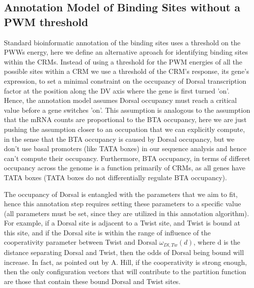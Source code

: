 \subsection{Annotation Model of Binding Sites without a PWM threshold}

Standard bioinformatic annotation of the binding sites uses a threshold on the PWWs energy, here we define an alternative aproach for identifying binding sites within the CRMs.  Instead of using a threshold for the PWM energies of all the possible sites within a CRM we use a threshold of the CRM's response, its gene's expression, to set a minimal constraint on the occupancy of Dorsal transcription factor at the position along the DV axis where the gene is first turned 'on'.  Hence, the annotation model assumes Dorsal occupancy must reach a critical value before a gene switches 'on'.  This assumption is analogous to the assumption that the mRNA counts are proportional to the BTA occupancy, here we are just pushing the assumption closer to an occupation that we can explicitly compute, in the sense that the BTA occupancy is caused by Dorsal occupancy, but we don't use basal promoters (like TATA boxes) in our sequence analysis and hence can't compute their occupancy.  Furthermore, BTA occupancy, in terms of differet occupancy across the genome is a function primarily of CRMs, as all genes have TATA boxes (TATA boxes do not differentially regulate BTA occupancy).  

The occupancy of Dorsal is entangled with the parameters that we aim to fit, hence this annotation step requires setting these parameters to a specific value (all parameters must be set, since they are utilized in this annotation algorithm).  For example, if a Dorsal site is adjacent to a Twist site, and Twist is bound at this site, and if the Dorsal site is within the range of influence of the cooperativity parameter between Twist and Dorsal $\omega_{Dl,Tw}(d)$, where d is the distance separating Dorsal and Twist, then the odds of Dorsal being bound will increase.  In fact, as pointed out by A. Hill, if the cooperativity is strong enough, then the only configuration vectors that will contribute to the partition function are those that contain these bound Dorsal and Twist sites.  
%

